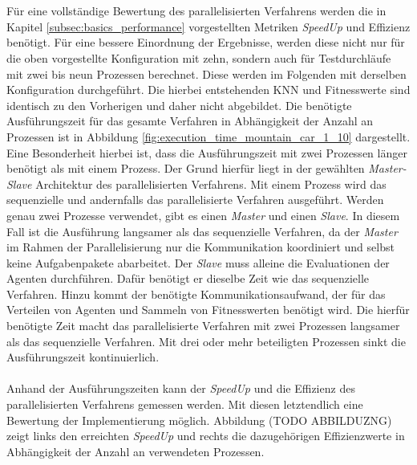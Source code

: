 \\\\
Für eine vollständige Bewertung des parallelisierten Verfahrens werden die in Kapitel \ref{subsec:basics_performance} vorgestellten Metriken \emph{SpeedUp} und Effizienz benötigt. Für eine bessere Einordnung der Ergebnisse, werden diese nicht nur für die oben vorgestellte Konfiguration mit zehn, sondern auch für Testdurchläufe mit zwei bis neun Prozessen berechnet. Diese werden im Folgenden mit derselben Konfiguration durchgeführt. Die hierbei entstehenden \ac{KNN} und Fitnesswerte sind identisch zu den Vorherigen und daher nicht abgebildet. Die benötigte Ausführungszeit für das gesamte Verfahren in Abhängigkeit der Anzahl an Prozessen ist in Abbildung \ref{fig:execution_time_mountain_car_1_10} dargestellt. Eine Besonderheit hierbei ist, dass die Ausführungszeit mit zwei Prozessen länger benötigt als mit einem Prozess. Der Grund hierfür liegt in der gewählten \emph{Master-Slave} Architektur des parallelisierten Verfahrens. Mit einem Prozess wird das sequenzielle und andernfalls das parallelisierte Verfahren ausgeführt. Werden genau zwei Prozesse verwendet, gibt es einen \emph{Master} und einen \emph{Slave}. In diesem Fall ist die Ausführung langsamer als das sequenzielle Verfahren, da der \emph{Master} im Rahmen der Parallelisierung nur die Kommunikation koordiniert und selbst keine Aufgabenpakete abarbeitet. Der \emph{Slave} muss alleine die Evaluationen der Agenten durchführen. Dafür benötigt er dieselbe Zeit wie das sequenzielle Verfahren. Hinzu kommt der benötigte Kommunikationsaufwand, der für das Verteilen von Agenten und Sammeln von Fitnesswerten benötigt wird. Die hierfür benötigte Zeit macht das parallelisierte Verfahren mit zwei Prozessen langsamer als das sequenzielle Verfahren. Mit drei oder mehr beteiligten Prozessen sinkt die Ausführungszeit kontinuierlich. 
\\\\
Anhand der Ausführungszeiten kann der \emph{SpeedUp} und die Effizienz des parallelisierten Verfahrens gemessen werden. Mit diesen letztendlich eine Bewertung der Implementierung möglich. Abbildung (TODO ABBILDUZNG) zeigt links den erreichten \emph{SpeedUp} und rechts die dazugehörigen Effizienzwerte in Abhängigkeit der Anzahl an verwendeten Prozessen.  

